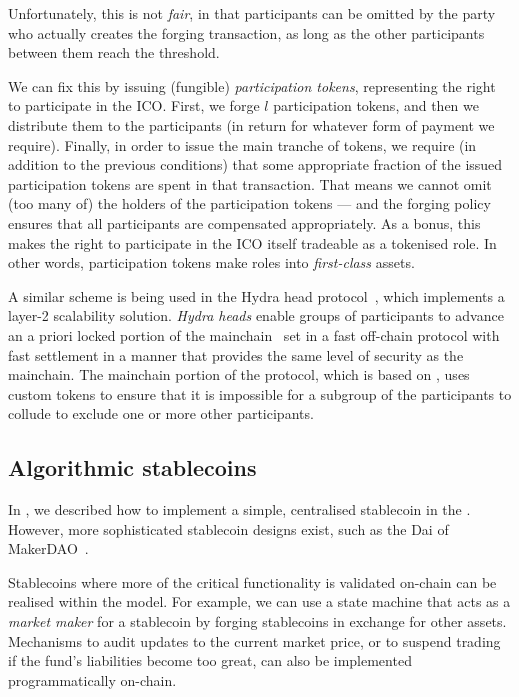 Unfortunately, this is not \emph{fair}, in that participants can be omitted by the party who actually creates the forging transaction, as long as the other participants between them reach the threshold.

We can fix this by issuing (fungible) \emph{participation tokens}, representing the right to participate in the ICO.
First, we forge $l$ participation tokens, and then we distribute them to the participants (in return for whatever form of payment we require).
Finally, in order to issue the main tranche of tokens, we require (in addition to the previous conditions) that some appropriate fraction of the issued participation tokens are spent in that transaction.
That means we cannot omit (too many of) the holders of the participation tokens --- and the forging policy ensures that all participants are compensated appropriately.
As a bonus, this makes the right to participate in the ICO itself tradeable as a tokenised role. In other words, participation tokens make roles into \emph{first-class} assets.

A similar scheme is being used in the Hydra head protocol~\cite{chakravarty2020hydra}, which implements a layer-2 scalability solution. \emph{Hydra heads} enable groups of participants to advance an a priori locked portion of the mainchain \UTXO\ set in a fast off-chain protocol with fast settlement in a manner that provides the same level of security as the mainchain. The mainchain portion of the protocol, which is based on \EUTXOma, uses custom tokens to ensure that it is impossible for a subgroup of the participants to collude to exclude one or more other participants.

\subsection{Algorithmic stablecoins}
\label{sec:stablecoins}

In \cite{plain-multicurrency}, we described how to implement a simple, centralised stablecoin in the \UTXOma{}.
However, more sophisticated stablecoin designs exist, such as the Dai of MakerDAO~\cite{team2017dai}.

Stablecoins where more of the critical functionality is validated on-chain can be realised within the \EUTXOma{} model. For example, we can use a state machine that acts as a \emph{market maker} for a stablecoin by forging stablecoins in exchange for other assets. Mechanisms to audit updates to the current market price,  or to suspend trading if the fund's liabilities become too great, can also be implemented programmatically on-chain.
